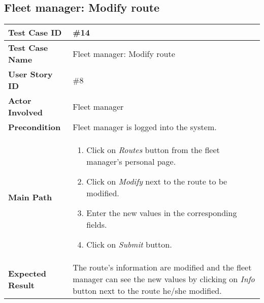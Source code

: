 \subsection{Fleet manager: Modify route}
\begin{center}
	\begin{tabular} { | m{3.5cm} | m{9.5cm} | }
		\hline
		\textbf{Test Case ID} & \#14\\
		\hline
		\textbf{Test Case Name} & Fleet manager: Modify route\\
		\hline
		\textbf{User Story ID} & \#8 \\
		\hline
		\textbf{Actor Involved} & Fleet manager\\
		\hline
		\textbf{Precondition} & Fleet manager is logged into the system.\\
		\hline
		\textbf{Main Path} & 
		\begin{enumerate}
			\item Click on \textit{Routes} button from the fleet manager's personal page.
			\item Click on \textit{Modify} next to the route to be modified.
			\item Enter the new values in the corresponding fields.
			\item Click on \textit{Submit} button.
		\end{enumerate}\\
		\hline
		\textbf{Expected Result} & The route's information are modified and the fleet manager can see the new values by clicking on \textit{Info} button next to the route he/she modified.\\
		\hline
	\end{tabular}
\end{center}
\newpage
